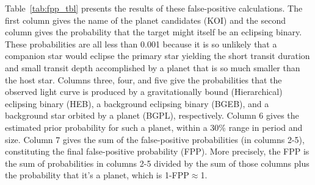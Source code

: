 \documentclass{emulateapj}
\begin{document}
Table~\ref{tab:fpp_tbl} presents the results of these false-positive
 calculations.  The first column gives the name of the planet
 candidates (KOI) and the second column gives the probability that the
 target might itself be an eclipsing binary.  These probabilities are
 all less than 0.001 because it is so unlikely that a companion star
 would eclipse the primary star yielding the short transit duration
 and small transit depth accomplished by a planet that is so much
 smaller than the host star.  Columns three, four, and five give the
 probabilities that the observed light curve is produced by a
 gravitationally bound (Hierarchical) eclipsing binary (HEB), a
 background eclipsing binary (BGEB), and a background star orbited by
 a planet (BGPL), respectively.  Column 6 gives the estimated prior
 probability for such a planet, within a 30\% range in period and
 size.  Column 7 gives the sum of the false-positive probabilities (in
 columns 2-5), constituting the final false-positive probability
 (FPP).  More precisely, the FPP is the sum of probabilities in
 columns 2-5 divided by the sum of those columns plus the probability
 that it's a planet, which is 1-FPP$\approx$1.
\end{document}
